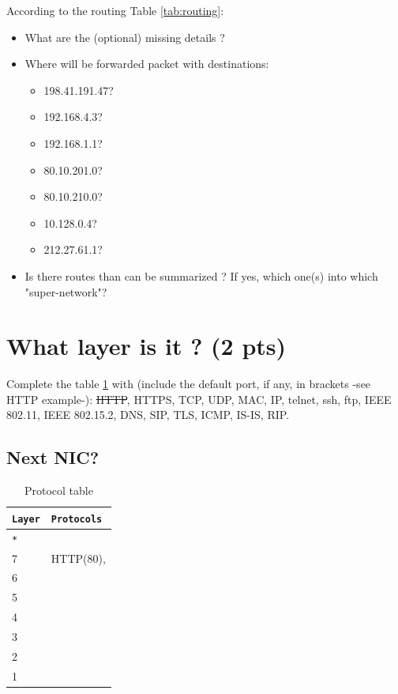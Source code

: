 \documentclass[11pt]{article}
\begin{document}
		According to the routing Table \ref{tab:routing}:
		\begin{itemize}
			\item What are the (optional) missing details ?%
			\item Where will be forwarded packet with destinations:
			\begin{itemize}
				\item 198.41.191.47?	%
				\item 192.168.4.3?		%
				\item 192.168.1.1?		%
				\item 80.10.201.0?		%
				\item 80.10.210.0?		%
				\item 10.128.0.4?		%
				\item 212.27.61.1?		%
			\end{itemize}
			\item Is there routes than can be summarized ? If yes, which one(s) into which "super-network"? %
		\end{itemize}

\pagebreak
\section{What layer is it ? (2 pts)}
	Complete the table \ref{tab:protocol} with (include the default port, if any, in brackets -see HTTP example-): \sout{HTTP}, HTTPS, TCP, UDP, MAC, IP, telnet, ssh, ftp, IEEE 802.11, IEEE 802.15.2, DNS, SIP, TLS, ICMP, IS-IS, RIP. %
	\subsection{Next NIC?}
		\renewcommand{\arraystretch}{1.5}
			\begin{table}[h]
			      \begin{tabular}{l|l}
			      		\verb+Layer+	&	\verb+Protocols+	\\ \hline
						\verb+*+		&	\\
			      		7				&	HTTP(80), \\
			      		6				&	\\
			      		5				&	\\
			      		4				&	\\
			      		3				&	\\
			      		2				&	\\
			      		1				&	\\
			      \end{tabular}
			      \caption{Protocol table}
			  \label{tab:protocol}
			\end{table}
		\renewcommand{\arraystretch}{1.0}
\end{document}
